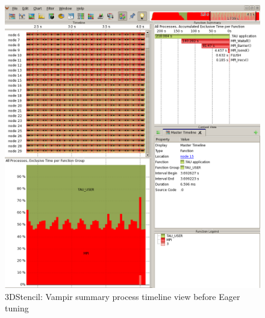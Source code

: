  \begin{figure}[tbp!]
  \centering
  \captionsetup{justification=centering}
  \includegraphics[scale=1.0,width=\columnwidth,keepaspectratio]{figures/Overlap-before}
         \caption{3DStencil: Vampir summary process timeline view before Eager tuning}
 \label{fig:beforeeager}
 \end{figure}

